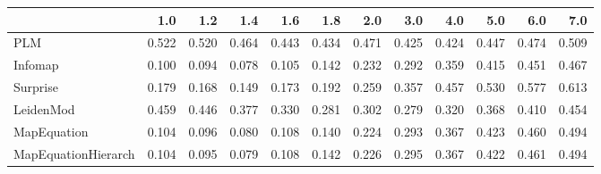 \begin{tabular}{lrrrrrrrrrrr}
\toprule
{} &   1.0 &   1.2 &   1.4 &   1.6 &   1.8 &   2.0 &   3.0 &   4.0 &   5.0 &   6.0 &   7.0 \\
\midrule
PLM                 & 0.522 & 0.520 & 0.464 & 0.443 & 0.434 & 0.471 & 0.425 & 0.424 & 0.447 & 0.474 & 0.509 \\
Infomap             & 0.100 & 0.094 & 0.078 & 0.105 & 0.142 & 0.232 & 0.292 & 0.359 & 0.415 & 0.451 & 0.467 \\
Surprise            & 0.179 & 0.168 & 0.149 & 0.173 & 0.192 & 0.259 & 0.357 & 0.457 & 0.530 & 0.577 & 0.613 \\
LeidenMod           & 0.459 & 0.446 & 0.377 & 0.330 & 0.281 & 0.302 & 0.279 & 0.320 & 0.368 & 0.410 & 0.454 \\
MapEquation         & 0.104 & 0.096 & 0.080 & 0.108 & 0.140 & 0.224 & 0.293 & 0.367 & 0.423 & 0.460 & 0.494 \\
MapEquationHierarch & 0.104 & 0.095 & 0.079 & 0.108 & 0.142 & 0.226 & 0.295 & 0.367 & 0.422 & 0.461 & 0.494 \\
\bottomrule
\end{tabular}
